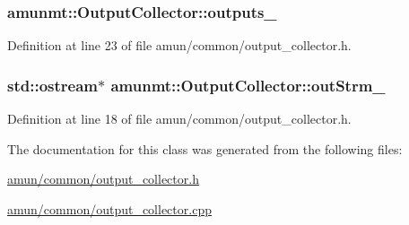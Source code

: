 \subsubsection[{\texorpdfstring{outputs\+\_\+}{outputs_}}]{ amunmt\+::\+Output\+Collector\+::outputs\+\_\+\hspace{0.3cm}{\ttfamily [protected]}}\hypertarget{classamunmt_1_1OutputCollector_ac945f2d433081e2fc89f2915d46d1c20}{}\label{classamunmt_1_1OutputCollector_ac945f2d433081e2fc89f2915d46d1c20}


Definition at line 23 of file amun/common/output\+\_\+collector.\+h.

\subsubsection[{\texorpdfstring{out\+Strm\+\_\+}{outStrm_}}]{\setlength{\rightskip}{0pt plus 5cm}std\+::ostream$\ast$ amunmt\+::\+Output\+Collector\+::out\+Strm\+\_\+\hspace{0.3cm}{\ttfamily [protected]}}\hypertarget{classamunmt_1_1OutputCollector_a77a2c3b366592e7bcebcdd167fccf28b}{}\label{classamunmt_1_1OutputCollector_a77a2c3b366592e7bcebcdd167fccf28b}


Definition at line 18 of file amun/common/output\+\_\+collector.\+h.



The documentation for this class was generated from the following files\+:\begin{DoxyCompactItemize}
\item 
\hyperlink{amun_2common_2output__collector_8h}{amun/common/output\+\_\+collector.\+h}\item 
\hyperlink{amun_2common_2output__collector_8cpp}{amun/common/output\+\_\+collector.\+cpp}\end{DoxyCompactItemize}
